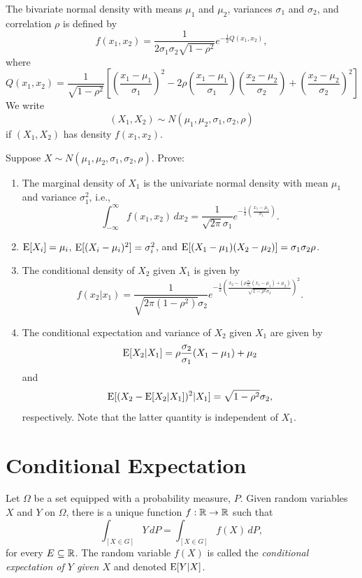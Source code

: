 \documentclass[12pt]{amsart}
\begin{document}
The bivariate normal density with means $\mu_1$ and $\mu_2$, variances $\sigma_1$ and $\sigma_2$,
and correlation $\rho$ is defined by
\[
f(x_1, x_2) 
= \frac1{2\sigma_1\sigma_2\sqrt{1-\rho^2}}e^{-\frac1{2}Q(x_1, x_2)},
\]
where
\[
    Q(x_1,x_2) = \frac1{\sqrt{1-\rho^2}}\left[
    \left(\frac{x_1-\mu_1}{\sigma_1}\right)^2
    - 2\rho \left(\frac{x_1-\mu_1}{\sigma_1}\right)\left(\frac{x_2-\mu_2}{\sigma_2}\right)
    + \left(\frac{x_2-\mu_2}{\sigma_2}\right)^2\right]
\]
We write
\[
    (X_1,X_2)\sim N(\mu_1, \mu_2, \sigma_1, \sigma_2, \rho)
\]
if $(X_1,X_2)$ has density $f(x_1,x_2)$. 

Suppose $X\sim N(\mu_1, \mu_2, \sigma_1, \sigma_2, \rho)$. Prove:
\begin{enumerate}
    \setlength{\itemsep}{1em}
    \item The marginal density of $X_1$ is the univariate normal density with mean $\mu_1$ 
    and variance $\sigma_1^2$, i.e.,
    $$\int_{-\infty}^\infty f(x_1,x_2)\,dx_2 = \frac1{\sqrt{2\pi}\sigma_1}
    e^{-\frac12\left(\frac{x_1-\mu_1}{\sigma_1}\right)}.$$
    \item $\operatorname{E}[X_i]=\mu_i$, $\operatorname{E}[(X_i - \mu_i)^2]=\sigma_i^2$, and 
    $\operatorname{E}[(X_1-\mu_1)(X_2-\mu_2)]=\sigma_1\sigma_2\rho$.
    \item The conditional density of $X_2$ given $X_1$ is given by
    $$
    f(x_2|x_1) = \frac1{\sqrt{2\pi(1-\rho^2)}\sigma_2}e^{-\frac12\left(\frac{x_2-\left(\rho\frac{\sigma_2}{\sigma_1}(x_1-\mu_1) + \mu_2\right)}{\sqrt{1-\rho^2}\sigma_2}\right)^2}.
    $$
\item The conditional expectation and variance of $X_2$ given $X_1$ are given by
    $$
    \operatorname{E}[X_2|X_1] = \rho\frac{\sigma_2}{\sigma_1}(X_1-\mu_1) + \mu_2
    $$
    and
    $$
    \operatorname{E}[(X_2 - \operatorname{E}[X_2|X_1])^2|X_1] = \sqrt{1-\rho^2}\sigma_2,
    $$
    respectively.
    Note that the latter quantity is independent of $X_1$.
\end{enumerate}

\section{Conditional Expectation}
\begin{thmdef}
Let $\Omega$ be a set equipped with a probability measure, $P$.
Given random variables $X$ and $Y$ on $\Omega$, there is a unique function
$f:\mathbb{R}\to\mathbb{R}$ such that
\[
    \int_{[X\in G]}Y\,dP = \int_{[X\in G]}f(X)\,dP,
\]
for every $E\subseteq \mathbb{R}$. The random variable $f(X)$ is called the
\emph{conditional expectation of $Y$ given $X$} and denoted $\operatorname{E}[Y|X]$.
\end{thmdef}
\end{document}
